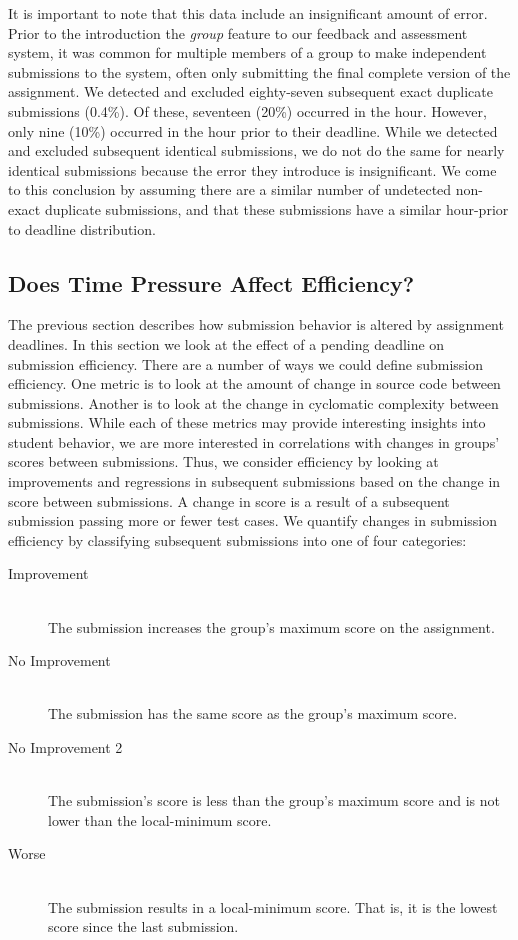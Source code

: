 It is important to note that this data include an insignificant amount of
error. Prior to the introduction the \emph{group} feature to our feedback and
assessment system, it was common for multiple members of a group to make
independent submissions to the system, often only submitting the final complete
version of the assignment. We detected and excluded eighty-seven subsequent
exact duplicate submissions (0.4\%). Of these, seventeen (20\%) occurred in the
 hour. However, only nine (10\%) occurred in the hour prior to their
deadline. While we detected and excluded subsequent identical submissions, we
do not do the same for nearly identical submissions because the error they
introduce is insignificant. We come to this conclusion by assuming there are a
similar number of undetected non-exact duplicate submissions, and that these
submissions have a similar hour-prior to deadline distribution.

\subsection{Does Time Pressure Affect Efficiency?}

The previous section describes how submission behavior is altered by assignment
deadlines. In this section we look at the effect of a pending deadline on
submission efficiency. There are a number of ways we could define submission
efficiency. One metric is to look at the amount of change in source code
between submissions. Another is to look at the change in cyclomatic complexity
between submissions. While each of these metrics may provide interesting
insights into student behavior, we are more interested in correlations with
changes in groups' scores between submissions. Thus, we consider efficiency by
looking at improvements and regressions in subsequent submissions based on the
change in score between submissions. A change in score is a result of a
subsequent submission passing more or fewer test cases. We quantify changes in
submission efficiency by classifying subsequent submissions into one of four
categories:

\begin{description}
  \item[Improvement] \hfill \\ The submission increases the group's maximum
    score on the assignment.
  \item[No Improvement] \hfill \\ The submission has the same score as the
    group's maximum score.
  \item[No Improvement 2] \hfill \\ The submission's score is less than the
    group's maximum score and is not lower than the local-minimum score.
  \item[Worse] \hfill \\ The submission results in a local-minimum score. That
    is, it is the lowest score since the last \imp{} submission.
\end{description}


